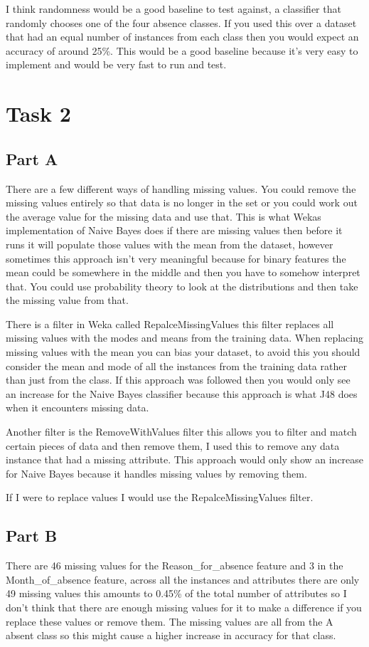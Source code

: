 \documentclass[10pt]{article}
\begin{document}
I think randomness would be a good baseline to test against, a classifier that randomly chooses one of the four absence classes. If you used this over a dataset that had an equal number of instances from each class then you would expect an accuracy of around 25\%. This would be a good baseline because it's very easy to implement and would be very fast to run and test.

\section*{Task 2}

\subsection*{Part A}
There are a few different ways of handling missing values. You could remove the missing values entirely so that data is no longer in the set or you could work out the average value for the missing data and use that. This is what Wekas implementation of Naive Bayes does if there are missing values then before it runs it will populate those values with the mean from the dataset, however sometimes this approach isn't very meaningful because for binary features the mean could be somewhere in the middle and then you have to somehow interpret that. You could use probability theory to look at the distributions and then take the missing value from that.

There is a filter in Weka called RepalceMissingValues this filter replaces all missing values  with the modes and means from the training data. When replacing missing values with the mean you can bias your dataset, to avoid this you should consider the mean and mode of all the instances from the training data rather than just from the class. If this approach was followed then you would only see an increase for the Naive Bayes classifier because this approach is what J48 does when it encounters missing data.

Another filter is the RemoveWithValues filter this allows you to filter and match certain pieces of data and then remove them, I used this to remove any data instance that had a missing attribute. This approach would only show an increase for Naive Bayes because it handles missing values by removing them.

If I were to replace values I would use the RepalceMissingValues filter.

\subsection*{Part B}
There are 46 missing values for the Reason\_for\_absence feature and 3 in the Month\_of\_absence feature, across all the instances and attributes there are only 49 missing values this amounts to 0.45\% of the total number of attributes so I don't think that there are enough missing values for it to make a difference if you replace these values or remove them. The missing values are all from the A absent class so this might cause a higher increase in accuracy for that class.
\end{document}
